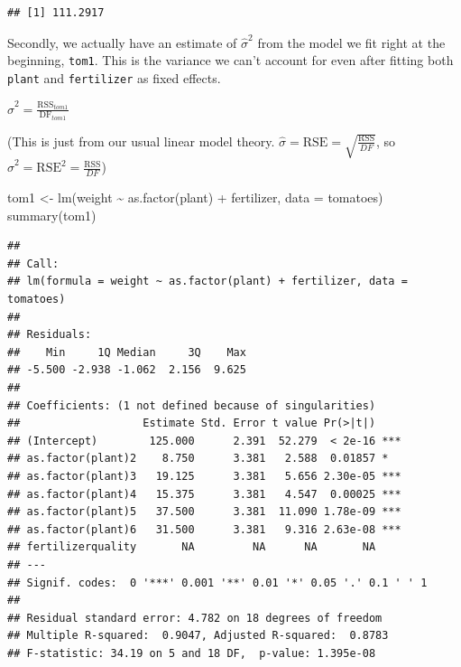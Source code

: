 \documentclass[
  openany]{book}
\newenvironment{Shaded}{\begin{snugshade}}{\end{snugshade}}
\newcommand{\AttributeTok}[1]{\textcolor[rgb]{0.77,0.63,0.00}{#1}}
\newcommand{\CommentTok}[1]{\textcolor[rgb]{0.56,0.35,0.01}{\textit{#1}}}
\newcommand{\DecValTok}[1]{\textcolor[rgb]{0.00,0.00,0.81}{#1}}
\newcommand{\FunctionTok}[1]{\textcolor[rgb]{0.00,0.00,0.00}{#1}}
\newcommand{\NormalTok}[1]{#1}
\newcommand{\OtherTok}[1]{\textcolor[rgb]{0.56,0.35,0.01}{#1}}
\newcommand{\SpecialCharTok}[1]{\textcolor[rgb]{0.00,0.00,0.00}{#1}}
\begin{document}
\begin{Shaded}
\end{Shaded}

\begin{verbatim}
## [1] 111.2917
\end{verbatim}

Secondly, we actually have an estimate of \(\hat{\sigma}^2\) from the model we fit right at the beginning, \texttt{tom1}. This is the variance we can't account for even after fitting both \texttt{plant} and \texttt{fertilizer} as fixed effects.

\(\hat{\sigma}^2 = \frac{\text{RSS}_{tom1}}{\text{DF}_{tom1}}\)

(This is just from our usual linear model theory. \(\hat{\sigma} = \text{RSE} = \sqrt{\frac{\text{RSS}}{DF}}\), so \(\hat{\sigma}^2 = \text{RSE}^2 = \frac{\text{RSS}}{DF}\))

\begin{Shaded}
\begin{Highlighting}[]
\NormalTok{tom1 }\OtherTok{\textless{}{-}} \FunctionTok{lm}\NormalTok{(weight }\SpecialCharTok{\textasciitilde{}} \FunctionTok{as.factor}\NormalTok{(plant) }\SpecialCharTok{+}\NormalTok{ fertilizer, }\AttributeTok{data =}\NormalTok{ tomatoes)}
\FunctionTok{summary}\NormalTok{(tom1)}
\end{Highlighting}
\end{Shaded}

\begin{verbatim}
## 
## Call:
## lm(formula = weight ~ as.factor(plant) + fertilizer, data = tomatoes)
## 
## Residuals:
##    Min     1Q Median     3Q    Max 
## -5.500 -2.938 -1.062  2.156  9.625 
## 
## Coefficients: (1 not defined because of singularities)
##                   Estimate Std. Error t value Pr(>|t|)    
## (Intercept)        125.000      2.391  52.279  < 2e-16 ***
## as.factor(plant)2    8.750      3.381   2.588  0.01857 *  
## as.factor(plant)3   19.125      3.381   5.656 2.30e-05 ***
## as.factor(plant)4   15.375      3.381   4.547  0.00025 ***
## as.factor(plant)5   37.500      3.381  11.090 1.78e-09 ***
## as.factor(plant)6   31.500      3.381   9.316 2.63e-08 ***
## fertilizerquality       NA         NA      NA       NA    
## ---
## Signif. codes:  0 '***' 0.001 '**' 0.01 '*' 0.05 '.' 0.1 ' ' 1
## 
## Residual standard error: 4.782 on 18 degrees of freedom
## Multiple R-squared:  0.9047, Adjusted R-squared:  0.8783 
## F-statistic: 34.19 on 5 and 18 DF,  p-value: 1.395e-08
\end{verbatim}
\end{document}
